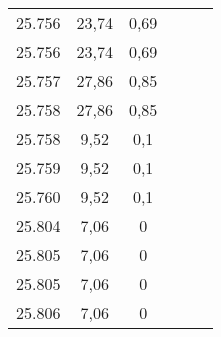 \begin{tabularx}{8.2cm}{@{}ccc|ccc@{}}
25.756 & 23,74 & 0,69 &  &  & \\
25.756 & 23,74 & 0,69 &  &  & \\
25.757 & 27,86 & 0,85 &  &  & \\
25.758 & 27,86 & 0,85 &  &  & \\
25.758 & 9,52 & 0,1 &  &  & \\
25.759 & 9,52 & 0,1 &  &  & \\
25.760 & 9,52 & 0,1 &  &  & \\
25.804 & 7,06 & 0 &  &  & \\
25.805 & 7,06 & 0 &  &  & \\
25.805 & 7,06 & 0 &  &  & \\
25.806 & 7,06 & 0 &  &  & \\
  \bottomrule
\end{tabularx}
